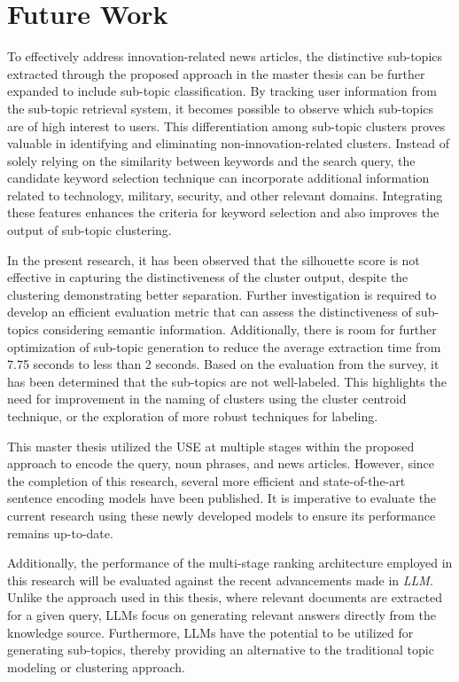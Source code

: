 \section{Future Work}

To effectively address innovation-related news articles, the distinctive sub-topics extracted through the proposed approach in the master thesis can be further expanded to include sub-topic classification. By tracking user information from the sub-topic retrieval system, it becomes possible to observe which sub-topics are of high interest to users. This differentiation among sub-topic clusters proves valuable in identifying and eliminating non-innovation-related clusters. Instead of solely relying on the similarity between keywords and the search query, the candidate keyword selection technique can incorporate additional information related to technology, military, security, and other relevant domains. Integrating these features enhances the criteria for keyword selection and also improves the output of sub-topic clustering.

In the present research, it has been observed that the silhouette score is not effective in capturing the distinctiveness of the cluster output, despite the clustering demonstrating better separation. Further investigation is required to develop an efficient evaluation metric that can assess the distinctiveness of sub-topics considering semantic information. Additionally, there is room for further optimization of sub-topic generation to reduce the average extraction time from 7.75 seconds to less than 2 seconds. Based on the evaluation from the survey, it has been determined that the sub-topics are not well-labeled. This highlights the need for improvement in the naming of clusters using the cluster centroid technique, or the exploration of more robust techniques for labeling.

This master thesis utilized the \ac{USE} at multiple stages within the proposed approach to encode the query, noun phrases, and news articles. However, since the completion of this research, several more efficient and state-of-the-art sentence encoding models have been published. It is imperative to evaluate the current research using these newly developed models to ensure its performance remains up-to-date.

Additionally, the performance of the multi-stage ranking architecture employed in this research will be evaluated against the recent advancements made in \textit{\ac{LLM}}. Unlike the approach used in this thesis, where relevant documents are extracted for a given query, \ac{LLM}s focus on generating relevant answers directly from the knowledge source. Furthermore, \ac{LLM}s have the potential to be utilized for generating sub-topics, thereby providing an alternative to the traditional topic modeling or clustering approach.


